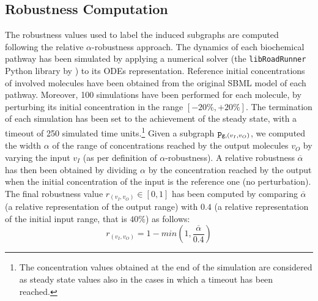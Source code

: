 \subsection{Robustness Computation}\label{sec:robustness-computation}
The robustness values used to label the induced subgraphs are computed following the relative $\alpha$-robustness approach. The dynamics of each biochemical pathway has been simulated by applying a numerical solver (the \texttt{libRoadRunner} Python library by \cite{somogyi2015libroadrunner}) to its ODEs representation. Reference initial concentrations of involved molecules have been obtained from the original SBML model of each pathway. Moreover, 100 simulations have been performed for each molecule, by perturbing its initial concentration in the range $[-20\%,+20\%]$. The termination of each simulation has been set to the achievement of the steady state, with a timeout of 250 simulated time units.\footnote{The concentration values obtained at the end of the simulation are considered as steady state values also in the cases in which a timeout has been reached.} Given a subgraph $\mathtt{p}_{\mathtt{g}, (v_I,v_O)}$, we computed the width $\alpha$ of the range of concentrations reached by the output molecules $v_O$ by varying the input $v_I$ (as per definition of $\alpha$-robustness). A relative robustness $\overline{\alpha}$ has then been obtained by dividing $\alpha$ by the concentration reached by the output when the initial concentration of the input is the reference one (no perturbation). The final robustness value $r_{(v_I,v_O)} \in [0,1]$ has been computed by comparing $\overline{\alpha}$ (a relative representation of the output range) with $0.4$ (a relative representation of the initial input range, that is $40\%$) as follows:
\[
    r_{(v_I,v_O)} = 1 - min (1,\frac{\overline{\alpha}}{0.4})
\]

